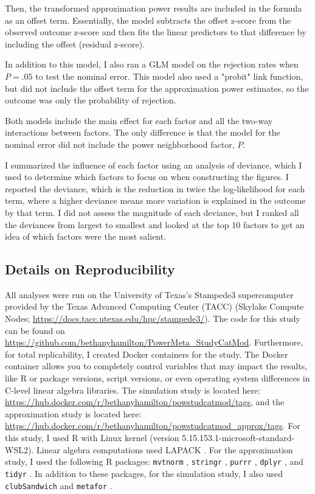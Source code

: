 Then, the transformed approximation power results are included in the formula as an offset term. Essentially, the model subtracts the offset z-score from the observed outcome z-score and then fits the linear predictors to that difference by including the offset (residual z-score).

In addition to this model, I also ran a GLM model on the rejection rates when $P=.05$ to test the nominal error. This model also used a "probit" link function, but did not include the offset term for the approximation power estimates, so the outcome was only the probability of rejection. 

Both models include the main effect for each factor and all the two-way interactions between factors. The only difference is that the model for the nominal error did not include the power neighborhood factor, $P$.  

I summarized the influence of each factor using an analysis of deviance, which I used to determine which factors to focus on when constructing the figures. I reported the deviance, which is the reduction in twice the log-likelihood for each term, where a higher deviance means more variation is explained in the outcome by that term. I did not assess the magnitude of each deviance, but I ranked all the deviances from largest to smallest and looked at the top 10 factors to get an idea of which factors were the most salient. 


\subsection{Details on Reproducibility}

All analyses were run on the University of Texas's Stampede3 supercomputer provided by the Texas Advanced Computing Center (TACC) (Skylake Compute Nodes; \url{https://docs.tacc.utexas.edu/hpc/stampede3/}). The code for this study can be found on \url{https://github.com/bethanyhamilton/PowerMeta_StudyCatMod}. Furthermore, for total replicability, I created Docker containers for the study. The Docker container allows you to completely control variables that may impact the results, like R or package versions, script versions, or even operating system differences in C-level linear algebra libraries. The simulation study is located here: \url{https://hub.docker.com/r/bethanyhamilton/powstudcatmod/tags}, and the approximation study is located here: \url{https://hub.docker.com/r/bethanyhamilton/powstudcatmod_approx/tags}. For this study, I used R \autocite[version 4.4.2;][]{R} with Linux kernel (version 5.15.153.1-microsoft-standard-WSL2). Linear algebra computations used LAPACK \autocite[version 3.12.0;][]{lapack99}. For the approximation study, I used the following R packages:
\texttt{mvtnorm}  \autocite[version 1.3-3;][]{mvtnorm}, \texttt{stringr}  \autocite[version 1.5.1;][]{stringr}, \texttt{purrr} \autocite[version 1.0.41;][]{purrr}, \texttt{dplyr} \autocite[version 1.1.4;][]{dplyr}, and \texttt{tidyr} \autocite[version 1.3.1;][]{tidyr}. In addition to these packages, for the simulation study, I also used \texttt{clubSandwich} \autocite[version 0.5.11;][]{pustejovsky2024a}  and \texttt{metafor} \autocite[version 4.8-0;][]{viechtbauer2010a}.


